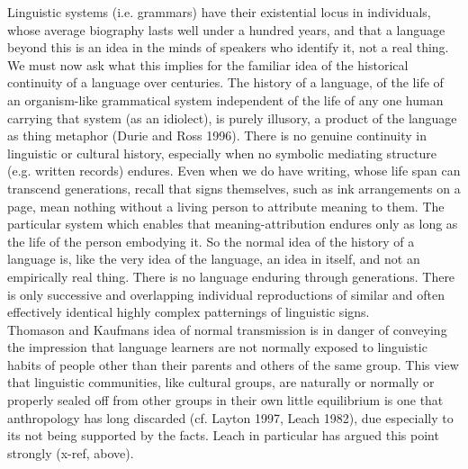 Linguistic systems (i.e. grammars) have their existential locus in individuals, whose average biography lasts well under a hundred years, and that a language beyond this is an idea in the minds of speakers who identify it, not a real thing. We must now ask what this implies for the familiar idea of the historical continuity of a language over centuries. The history of a language, of the life of an organism-like grammatical system independent of the life of any one human carrying that system (as an idiolect), is purely illusory, a product of the language as thing metaphor (Durie and Ross 1996). There is no genuine continuity in linguistic or cultural history, especially when no symbolic mediating structure (e.g. written records) endures. Even when we do have writing, whose life span can transcend generations, recall that signs themselves, such as ink arrangements on a page, mean nothing without a living person to attribute meaning to them. The particular system which enables that meaning-attribution endures only as long as the life of the person embodying it. So the normal idea of the history of a language is, like the very idea of the language, an idea in itself, and not an empirically real thing. There is no language enduring through generations. There is only successive and overlapping individual reproductions of similar and often effectively identical highly complex patternings of linguistic signs.
\\
Thomason and Kaufmans idea of normal transmission is in danger of conveying the impression that language learners are not normally exposed to linguistic habits of people other than their parents and others of the same group. This view that linguistic communities, like cultural groups, are naturally or normally or properly sealed off from other groups in their own little equilibrium is one that anthropology has long discarded (cf. Layton 1997, Leach 1982), due especially to its not being supported by the facts. Leach in particular has argued this point strongly (x-ref, above). 
